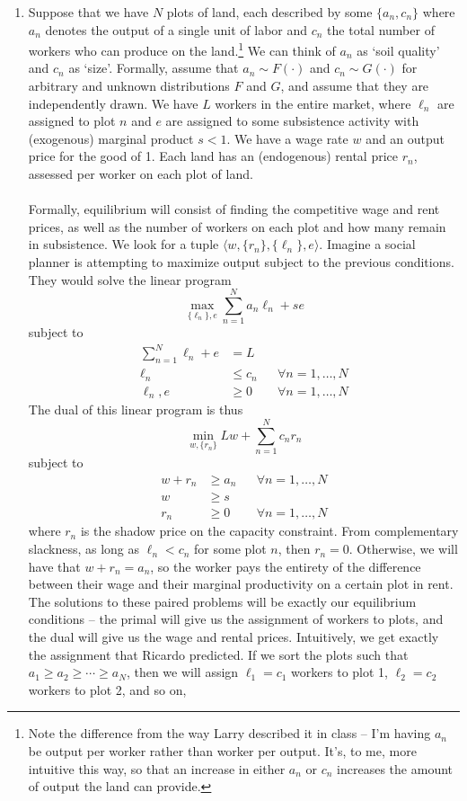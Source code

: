 \documentclass[10pt]{article}
\begin{document}
\maketitle

\begin{enumerate}
	\item Suppose that we have $N$ plots of land, each described by some $\{a_n,c_n\}$ where $a_n$ denotes the output of a single unit of labor and $c_n$ the total number of workers who can produce on the land.\footnote{Note the difference from the way Larry described it in class -- I'm having $a_n$ be output per worker rather than worker per output. It's, to me, more intuitive this way, so that an increase in either $a_n$ or $c_n$ increases the amount of output the land can provide.} We can think of $a_n$ as `soil quality' and $c_n$ as `size'. Formally, assume that $a_n \sim F(\cdot)$ and $c_n \sim G(\cdot)$ for arbitrary and unknown distributions $F$ and $G$, and assume that they are independently drawn. We have $L$ workers in the entire market, where $\ell_n$ are assigned to plot $n$ and $e$ are assigned to some subsistence activity with (exogenous) marginal product $s < 1$. We have a wage rate $w$ and an output price for the good of 1. Each land has an (endogenous) rental price $r_n$, assessed per worker on each plot of land. \\\\Formally, equilibrium will consist of finding the competitive wage and rent prices, as well as the number of workers on each plot and how many remain in subsistence. We look for a tuple $\langle w, \{r_n\},\{\ell_n\},e\rangle$. Imagine a social planner is attempting to maximize output subject to the previous conditions. They would solve the linear program\[\max_{\{\ell_n\},e} \sum_{n=1}^N a_n \ell_n + se\]subject to\begin{align*} \sum_{n=1}^N \ell_n + e &= L \\ \ell_n &\le c_n &&\forall n = 1,\dots,N\\ \ell_n,e &\ge 0 &&\forall n = 1,\dots,N\end{align*}The dual of this linear program is thus\[\min_{w,\{r_n\}} Lw + \sum_{n=1}^N c_n r_n \]subject to\begin{align*} w + r_n &\ge a_n &&\forall n = 1,\dots,N \\ w &\ge s \\ r_n &\ge 0 &&\forall n = 1,\dots,N\end{align*}where $r_n$ is the shadow price on the capacity constraint. From complementary slackness, as long as $\ell_n < c_n$ for some plot $n$, then $r_n = 0$. Otherwise, we will have that $w + r_n= a_n$, so the worker pays the entirety of the difference between their wage and their marginal productivity on a certain plot in rent. The solutions to these paired problems will be exactly our equilibrium conditions -- the primal will give us the assignment of workers to plots, and the dual will give us the wage and rental prices. Intuitively, we get exactly the assignment that Ricardo predicted. If we sort the plots such that $a_1 \ge a_2 \ge \cdots \ge a_N$, then we will assign $\ell_1 = c_1$ workers to plot 1, $\ell_2 = c_2$ workers to plot 2, and so on, 
\end{enumerate}
\end{document}
